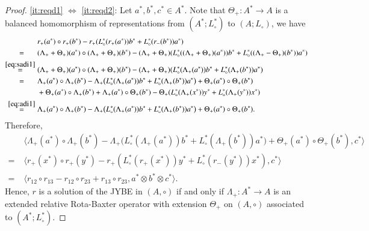 \documentclass[12pt, reqno, a4paper]{amsart}
\theoremstyle{definition}
\begin{document}
\begin{proof}\ref{it:reqd1} $\Longleftrightarrow$ \ref{it:reqd2}: 	Let $a^*, b^*, c^* \in A^*$. 
	Note that $\Theta_{+}: A^* \to A$ is a balanced homomorphism of representations from $(A^*; L_{\circ}^*)$ to $(A; L_{\circ})$, we have
	\begin{align*}
		 & r_{+}(a^{*}) \circ r_{+}(b^{*}) - r_{+}(L_{\circ}^*(r_{+}(a^{*})) b^{*}+L_{\circ}^{*}(r_{-}(b^{*})) a^{*})                                                                                                    \\
		 \overset{\hphantom{\eqref{eq:adi1}}}{=}\; & (\Lambda_{+}+\Theta_{+})(a^{*}) \circ (\Lambda_{+}+\Theta_{+})(b^{*}) - (\Lambda_{+}+\Theta_{+})(L_{\circ}^{*}((\Lambda_{+}+\Theta_{+})(a^{*})) b^{*}+L_{\circ}^{*}((\Lambda_{+}-\Theta_{+})(b^{*})) a^{*}) \\
		 \overset{\eqref{eq:sadi1}}{=}\; &  (\Lambda_{+}+\Theta_{+})(a^{*}) \circ (\Lambda_{+}+\Theta_{+})(b^{*}) - (\Lambda_{+}+\Theta_{+})(L_{\circ}^{*}(\Lambda_{+}(a^{*})) b^{*}+L_{\circ}^{*}(\Lambda_{+}(b^{*})) a^{*})                           \\
		 \overset{\hphantom{\eqref{eq:adi1}}}{=}\; & \Lambda_{+}(a^*) \circ \Lambda_{+}(b^*) - \Lambda_{+}\big(L_{\circ}^*(\Lambda_{+}(a^*))b^* + L_{\circ}^*(\Lambda_{+}(b^*))a^*\big) + \Theta_{+}(a^*) \circ \Theta_{+}(b^*)                                  \\
		 & + \Theta_{+}(a^*) \circ \Lambda_{+}(b^*) + \Lambda_{+}(a^*) \circ \Theta_{+}(b^*) - \Theta_{+}(L_{\circ}^{*}(\Lambda_{+}(x^{*})) y^{*}+L_{\circ}^{*}(\Lambda_{+}(y^{*})) x^{*})                         \\
		 \overset{\eqref{eq:adi1}}{=}\;&  \Lambda_{+}(a^*) \circ \Lambda_{+}(b^*) - \Lambda_{+}\big(L_{\circ}^*(\Lambda_{+}(a^*))b^* + L_{\circ}^*(\Lambda_{+}(b^*))a^*\big) + \Theta_{+}(a^*) \circ \Theta_{+}(b^*).
	\end{align*}
	Therefore,
	\begin{align*}
		& \langle \Lambda_{+}(a^*) \circ \Lambda_{+}(b^*) - \Lambda_{+}\big(L_{\circ}^*(\Lambda_{+}(a^*))b^* + L_{\circ}^*(\Lambda_{+}(b^*))a^*\big) + \Theta_{+}(a^*) \circ \Theta_{+}(b^*), c^* \rangle \\
		=\; & \langle r_{+}(x^{*}) \circ r_{+}(y^{*}) - r_{+}(L_{\circ}^{*}(r_{+}(x^{*})) y^{*}+L_{\circ}^{*}(r_{-}(y^{*})) x^{*}) , c^*\rangle \\
		=\; & \langle r_{12} \circ r_{13} - r_{12} \circ r_{23} + r_{13} \circ r_{23}, a^* \otimes b^* \otimes c^*\rangle.
	\end{align*}
	Hence, $r$ is a solution of the JYBE in $(A, \circ)$ if and only if $\Lambda_{+}: A^* \to A$ is an extended relative Rota-Baxter operator with extension $\Theta_{+}$ on $(A, \circ)$ associated to $(A^*; L_{\circ}^*)$.




\end{proof}
\end{document}
